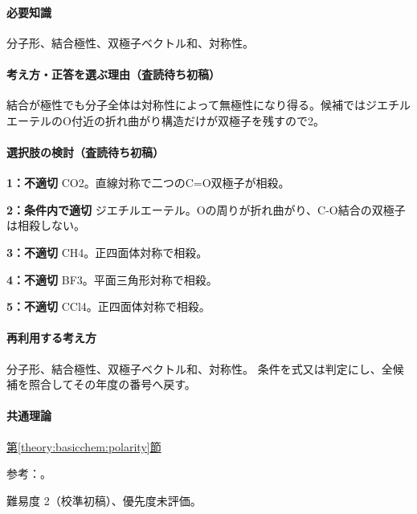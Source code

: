 \paragraph{必要知識} 分子形、結合極性、双極子ベクトル和、対称性。

\paragraph{考え方・正答を選ぶ理由（査読待ち初稿）} 結合が極性でも分子全体は対称性によって無極性になり得る。候補ではジエチルエーテルのO付近の折れ曲がり構造だけが双極子を残すので2。

\paragraph{選択肢の検討（査読待ち初稿）}\mbox{}\par

\noindent\textbf{1：不適切} CO2。直線対称で二つのC=\allowbreak{}O双極子が相殺。\par

\noindent\textbf{2：条件内で適切} ジエチルエーテル。Oの周りが折れ曲がり、C-O結合の双極子は相殺しない。\par

\noindent\textbf{3：不適切} CH4。正四面体対称で相殺。\par

\noindent\textbf{4：不適切} BF3。平面三角形対称で相殺。\par

\noindent\textbf{5：不適切} CCl4。正四面体対称で相殺。\par

\paragraph{再利用する考え方} 分子形、結合極性、双極子ベクトル和、対称性。 条件を式又は判定にし、全候補を照合してその年度の番号へ戻す。

\paragraph{共通理論} \hyperref[theory:basicchem:polarity]{第\ref*{theory:basicchem:polarity}節}

\par 参考：\cite{finish56_polarity}。

\par 難易度 2（校準初稿）、優先度未評価。

